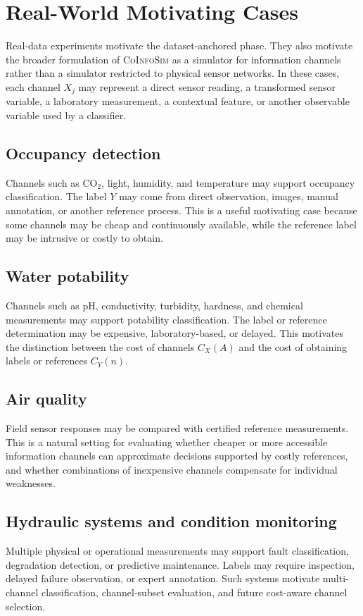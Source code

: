 \documentclass[11pt,a4paper]{article}
\newcommand{\CoInfoSim}{\textsc{CoInfoSim}}
\begin{document}
\appendix

\section{Real-World Motivating Cases}

Real-data experiments motivate the dataset-anchored phase. They also motivate the broader formulation of \CoInfoSim{} as a simulator for information channels rather than a simulator restricted to physical sensor networks. In these cases, each channel $X_j$ may represent a direct sensor reading, a transformed sensor variable, a laboratory measurement, a contextual feature, or another observable variable used by a classifier.

\subsection*{Occupancy detection}
Channels such as CO$_2$, light, humidity, and temperature may support occupancy classification. The label $Y$ may come from direct observation, images, manual annotation, or another reference process. This is a useful motivating case because some channels may be cheap and continuously available, while the reference label may be intrusive or costly to obtain.

\subsection*{Water potability}
Channels such as pH, conductivity, turbidity, hardness, and chemical measurements may support potability classification. The label or reference determination may be expensive, laboratory-based, or delayed. This motivates the distinction between the cost of channels $C_X(A)$ and the cost of obtaining labels or references $C_Y(n)$.

\subsection*{Air quality}
Field sensor responses may be compared with certified reference measurements. This is a natural setting for evaluating whether cheaper or more accessible information channels can approximate decisions supported by costly references, and whether combinations of inexpensive channels compensate for individual weaknesses.

\subsection*{Hydraulic systems and condition monitoring}
Multiple physical or operational measurements may support fault classification, degradation detection, or predictive maintenance. Labels may require inspection, delayed failure observation, or expert annotation. Such systems motivate multi-channel classification, channel-subset evaluation, and future cost-aware channel selection.
\end{document}
